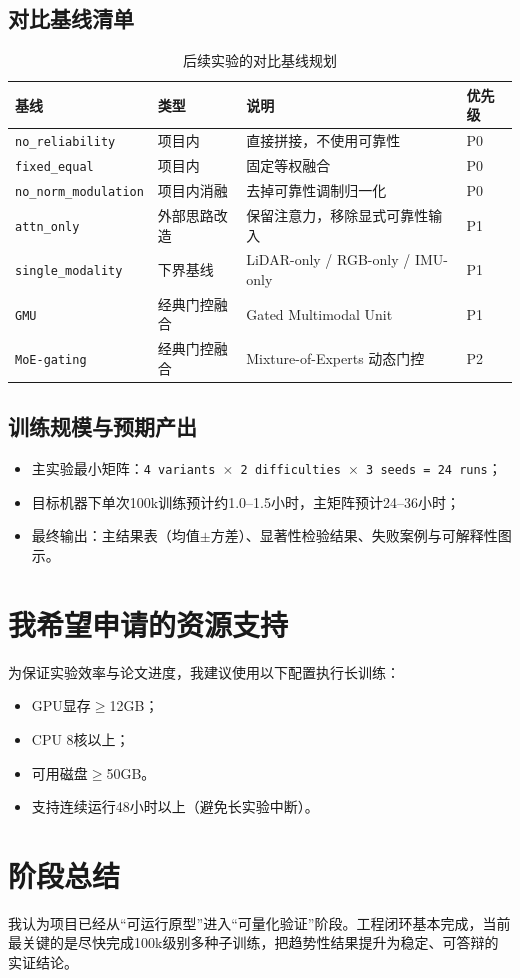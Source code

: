 \subsection{对比基线清单}
\begin{table}[h!]
    \centering
    \caption{后续实验的对比基线规划}
    \label{tab-student-plan-baselines}
    \footnotesize
    \begin{tabular}{p{3.0cm}p{1.8cm}p{4.2cm}p{1.4cm}}
        \toprule
        基线 & 类型 & 说明 & 优先级 \\
        \midrule
        \texttt{no\_reliability} & 项目内 & 直接拼接，不使用可靠性 & P0 \\
        \texttt{fixed\_equal} & 项目内 & 固定等权融合 & P0 \\
        \texttt{no\_norm\_modulation} & 项目内消融 & 去掉可靠性调制归一化 & P0 \\
        \texttt{attn\_only} & 外部思路改造 & 保留注意力，移除显式可靠性输入 & P1 \\
        \texttt{single\_modality} & 下界基线 & LiDAR-only / RGB-only / IMU-only & P1 \\
        \texttt{GMU} & 经典门控融合 & Gated Multimodal Unit & P1 \\
        \texttt{MoE-gating} & 经典门控融合 & Mixture-of-Experts 动态门控 & P2 \\
        \bottomrule
    \end{tabular}
\end{table}

\subsection{训练规模与预期产出}
\begin{itemize}
    \item 主实验最小矩阵：\texttt{4 variants $\times$ 2 difficulties $\times$ 3 seeds = 24 runs}；
    \item 目标机器下单次100k训练预计约1.0--1.5小时，主矩阵预计24--36小时；
    \item 最终输出：主结果表（均值$\pm$方差）、显著性检验结果、失败案例与可解释性图示。
\end{itemize}

\section{我希望申请的资源支持}
为保证实验效率与论文进度，我建议使用以下配置执行长训练：
\begin{itemize}
    \item GPU显存$\ge$12GB；
    \item CPU 8核以上；
    \item 可用磁盘$\ge$50GB。
    \item 支持连续运行48小时以上（避免长实验中断）。
\end{itemize}

\section{阶段总结}
我认为项目已经从“可运行原型”进入“可量化验证”阶段。工程闭环基本完成，当前最关键的是尽快完成100k级别多种子训练，把趋势性结果提升为稳定、可答辩的实证结论。
